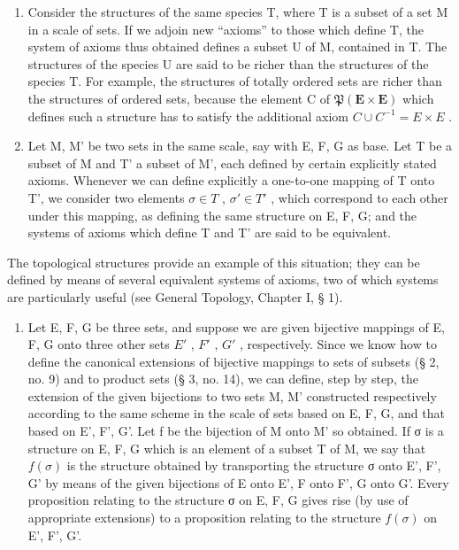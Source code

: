 \begin{enumerate}
\def\labelenumi{\arabic{enumi}.}
\setcounter{enumi}{2}
\item
  Consider the structures of the same species T, where T is a subset of a set M in a scale of sets. If we adjoin new ``axioms'' to those which define T, the system of axioms thus obtained defines a subset U of M, contained in T. The structures of the species U are said to be richer than the structures of the species T. For example, the structures of totally ordered sets are richer than the structures of ordered sets, because the element C of \(\mathfrak{P}(\mathbf{E} \times \mathbf{E})\) which defines such a structure has to satisfy the additional axiom \(C \cup C^{-1} = E \times E\) .
\item
  Let M, M' be two sets in the same scale, say with E, F, G as base. Let T be a subset of M and T' a subset of M', each defined by certain explicitly stated axioms. Whenever we can define explicitly a one-to-one mapping of T onto T', we consider two elements \(\sigma \in T\) , \(\sigma' \in T'\) , which correspond to each other under this mapping, as defining the same structure on E, F, G; and the systems of axioms which define T and T' are said to be equivalent.
\end{enumerate}

The topological structures provide an example of this situation; they can be defined by means of several equivalent systems of axioms, two of which systems are particularly useful (see General Topology, Chapter I, § 1).

\begin{enumerate}
\def\labelenumi{\arabic{enumi}.}
\setcounter{enumi}{4}
\tightlist
\item
  Let E, F, G be three sets, and suppose we are given bijective mappings of E, F, G onto three other sets \(E'\) , \(F'\) , \(G'\) , respectively. Since we know how to define the canonical extensions of bijective mappings to sets of subsets (§ 2, no. 9) and to product sets (§ 3, no. 14), we can define, step by step, the extension of the given bijections to two sets M, M' constructed respectively according to the same scheme in the scale of sets based on E, F, G, and that based on E', F', G'. Let f be the bijection of M onto M' so obtained. If σ is a structure on E, F, G which is an element of a subset T of M, we say that \(f(\sigma)\) is the structure obtained by transporting the structure σ onto E', F', G' by means of the given bijections of E onto E', F onto F', G onto G'. Every proposition relating to the structure σ on E, F, G gives rise (by use of appropriate extensions) to a proposition relating to the structure \(f(\sigma)\) on E', F', G'.
\end{enumerate}

